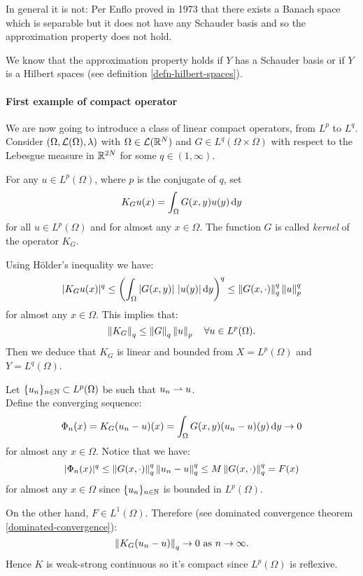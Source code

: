 In general it is not: Per Enflo proved in 1973 that there exists a Banach space which is separable but it does not have any Schauder basis and so the approximation property does not hold.

We know that the approximation property holds if $Y$ has a Schauder basis or if $Y$ is a Hilbert spaces (see definition \vref{defn-hilbert-spaces}).


\paragraph{First example of compact operator} We are now going to introduce a class of linear compact operators, from $L^p$ to $L^q$.\\
Consider $(\Omega, \mathcal L(\Omega), \lambda)$ with $\Omega \in \mathcal L(\mathbb R^N)$
and $G \in L^q(\Omega \times \Omega)$ with respect to the Lebesgue measure in $\mathbb R^{2N}$
for some $q \in (1, \infty)$.

For any $u \in L^p(\Omega)$, where $p$ is the conjugate of $q$, set
$$K_G u(x) = \int_\Omega G(x,y) u(y) \,\mathrm d y$$
for all $u \in L^p(\Omega)$ and for almost any $x \in \Omega$.
The function $G$ is called \emph{kernel} of the operator $K_G$.

Using Hölder's inequality we have:
$$
	|K_G u(x)|^q
	\leq \left( \int_\Omega |G(x,y)| \ |u(y)| \,\mathrm d y \right)^q
	\leq \left\lVert G(x, \cdot)\right\rVert_q^q\left\lVert u\right\rVert_p^q
$$
for almost any $x \in \Omega$. This implies that:
$$
	\left\lVert K_G\right\rVert_{q}
	\leq \left\lVert G\right\rVert_{q} \left\lVert u\right\rVert_{p}
	\quad \forall u \in L^p(\Omega)
	.
$$
Then we deduce that $K_G$ is linear and bounded from $X=L^p(\Omega)$ and $Y=L^q(\Omega)$.

Let $\{u_n\}_{n\in \mathbb N} \subset L^p(\Omega)$ be such that $u_n \rightharpoonup u$.\\
Define the converging sequence:
$$\Phi_n(x) = K_G(u_n - u)(x) = \int_\Omega G(x,y)(u_n - u)(y) \, \mathrm d y \to 0$$
for almost any $x \in \Omega$. Notice that we have:
$$|\Phi_n(x)|^q \leq \left\lVert G(x, \cdot)\right\rVert^q_q \left\lVert u_n - u\right\rVert_q^q \leq M \left\lVert G(x, \cdot)\right\rVert_q^q  = F(x)$$
for almost any $x \in \Omega$ since $\{u_n\}_{n \in \mathbb N}$ is bounded in $L^p(\Omega)$.

On the other hand, $F \in L^1(\Omega)$. Therefore (see dominated convergence theorem \vref{dominated-convergence}):
$$ \left\lVert K_G(u_n -u)\right\rVert_q \to 0 \text{ as } n \to \infty.$$
Hence $K$ is weak-strong continuous so it's compact since $L^p(\Omega)$ is reflexive.

